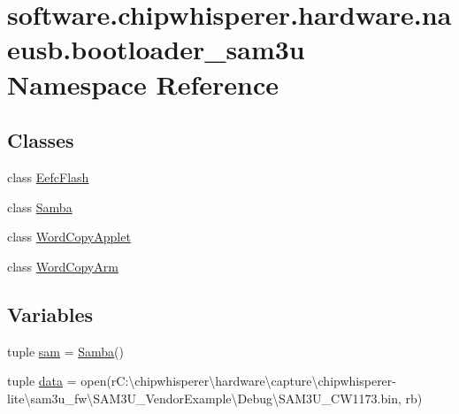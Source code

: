 \hypertarget{namespacesoftware_1_1chipwhisperer_1_1hardware_1_1naeusb_1_1bootloader__sam3u}{}\section{software.\+chipwhisperer.\+hardware.\+naeusb.\+bootloader\+\_\+sam3u Namespace Reference}
\label{namespacesoftware_1_1chipwhisperer_1_1hardware_1_1naeusb_1_1bootloader__sam3u}
\subsection*{Classes}
\begin{DoxyCompactItemize}
\item 
class \hyperlink{classsoftware_1_1chipwhisperer_1_1hardware_1_1naeusb_1_1bootloader__sam3u_1_1EefcFlash}{Eefc\+Flash}
\item 
class \hyperlink{classsoftware_1_1chipwhisperer_1_1hardware_1_1naeusb_1_1bootloader__sam3u_1_1Samba}{Samba}
\item 
class \hyperlink{classsoftware_1_1chipwhisperer_1_1hardware_1_1naeusb_1_1bootloader__sam3u_1_1WordCopyApplet}{Word\+Copy\+Applet}
\item 
class \hyperlink{classsoftware_1_1chipwhisperer_1_1hardware_1_1naeusb_1_1bootloader__sam3u_1_1WordCopyArm}{Word\+Copy\+Arm}
\end{DoxyCompactItemize}
\subsection*{Variables}
\begin{DoxyCompactItemize}
\item 
tuple \hyperlink{namespacesoftware_1_1chipwhisperer_1_1hardware_1_1naeusb_1_1bootloader__sam3u_a74424e87ad4739643b778f0a94ef423f}{sam} = \hyperlink{classsoftware_1_1chipwhisperer_1_1hardware_1_1naeusb_1_1bootloader__sam3u_1_1Samba}{Samba}()
\item 
tuple \hyperlink{namespacesoftware_1_1chipwhisperer_1_1hardware_1_1naeusb_1_1bootloader__sam3u_a5c756345d0ae8d1101a105f598850a1b}{data} = open(r\textquotesingle{}C\+:\textbackslash{}chipwhisperer\textbackslash{}hardware\textbackslash{}capture\textbackslash{}chipwhisperer-\/lite\textbackslash{}sam3u\+\_\+fw\textbackslash{}\+S\+A\+M3\+U\+\_\+\+Vendor\+Example\textbackslash{}\+Debug\textbackslash{}\+S\+A\+M3\+U\+\_\+\+C\+W1173.\+bin\textquotesingle{}, \textquotesingle{}rb\textquotesingle{})
\end{DoxyCompactItemize}


